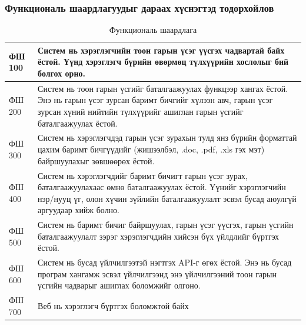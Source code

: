 \subsubsection{Функциональ шаардлагуудыг дараах хүснэгтэд тодорхойлов}
\begin{table}[h]
	\centering
	\caption{Функциональ шаардлага}
	\begin{tabular}{ |p{2cm}|p{13cm}| }
		\hline
		ФШ 100 & Систем нь хэрэглэгчийн тоон гарын үсэг үүсгэх чадвартай байх ёстой. Үүнд хэрэглэгч бүрийн өвөрмөц түлхүүрийн хослолыг бий болгох орно.                                                                             \\ \hline
		ФШ 200 & Систем нь тоон гарын үсгийг баталгаажуулах функцээр хангах ёстой. Энэ нь гарын үсэг зурсан баримт бичгийг хүлээн авч, гарын үсэг зурсан хүний нийтийн түлхүүрийг ашиглан гарын үсгийг баталгаажуулах ёстой.        \\ \hline
		ФШ 300 & Систем нь хэрэглэгчдэд гарын үсэг зурахын тулд янз бүрийн форматтай цахим баримт бичгүүдийг (жишээлбэл, .doc, .pdf, .xls гэх мэт) байршуулахыг зөвшөөрөх ёстой.                                                    \\ \hline
		ФШ 400 & Систем нь хэрэглэгчдийг баримт бичигт гарын үсэг зурах, баталгаажуулахаас өмнө баталгаажуулах ёстой. Үүнийг хэрэглэгчийн нэр/нууц үг, олон хүчин зүйлийн баталгаажуулалт эсвэл бусад аюулгүй аргуудаар хийж болно. \\ \hline
		ФШ 500 & Систем нь баримт бичиг байршуулах, гарын үсэг үүсгэх, гарын үсгийн баталгаажуулалт зэрэг хэрэглэгчдийн хийсэн бүх үйлдлийг бүртгэх ёстой.                                                                          \\ \hline
		ФШ 600 & Систем нь бусад үйлчилгээтэй нэгтгэх API-г өгөх ёстой. Энэ нь бусад програм хангамж эсвэл үйлчилгээнд энэ үйлчилгээний тоон гарын үсгийн чадварыг ашиглах боломжийг олгоно.                                        \\  \hline
		ФШ 700 & Веб нь хэрэглэгч бүртгэх боломжтой байх                                                                                                                                                                            \\ \hline
	\end{tabular}
\end{table}
\pagebreak
